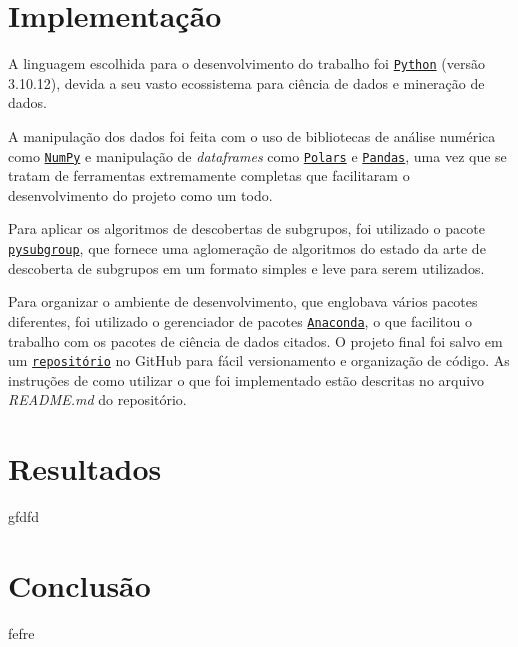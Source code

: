 \documentclass{article}
\begin{document}
\section{Implementação}

A linguagem escolhida para o desenvolvimento do trabalho foi
\href{https://www.python.org/}{\texttt{Python}} (versão 3.10.12), devida a seu
vasto ecossistema para ciência de dados e mineração de dados.

A manipulação dos dados foi feita com o uso de bibliotecas
de análise numérica como \href{https://numpy.org/}{\texttt{NumPy}} e
manipulação de \textit{dataframes} como
\href{https://pola.rs/}{\texttt{Polars}} e
\href{https://pandas.pydata.org/}{\texttt{Pandas}},
uma vez que se tratam de ferramentas extremamente completas que facilitaram o
desenvolvimento do projeto como um todo.

Para aplicar os algoritmos de descobertas de subgrupos, foi utilizado o pacote
\href{https://pysubgroup.readthedocs.io/en/latest/}{\texttt{pysubgroup}}, que
fornece uma aglomeração de algoritmos do estado da arte de descoberta de
subgrupos em um formato simples e leve para serem utilizados.


Para organizar o ambiente de desenvolvimento, que englobava vários pacotes
diferentes, foi utilizado o gerenciador de pacotes
\href{https://www.anaconda.com/}{\texttt{Anaconda}}, o que facilitou o trabalho
com os pacotes de ciência de dados citados. O projeto final foi salvo em um
\href{https://github.com/lframosferreira/projeto-ad}{\texttt{repositório}}
no GitHub para fácil versionamento e organização de código. As instruções de
como
utilizar o que foi implementado estão descritas no arquivo \textit{README.md}
do repositório.

\section{Resultados}

gfdfd

\section{Conclusão}

fefre

\newpage

\renewcommand{\refname}{Referências Bibliográficas}

\end{document}
